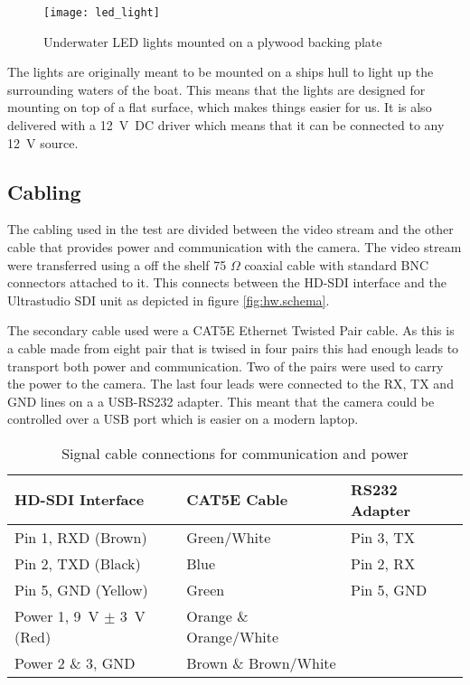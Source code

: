\begin{figure}[htbp]
	\centering
	\texttt{[image: led\_light]}
	\caption{Underwater LED lights mounted on a plywood backing plate}
	\label{fig:underwater_light}
\end{figure}

The lights are originally meant to be mounted on a ships hull to light up the surrounding waters of the boat. 
This means that the lights are designed for mounting on top of a flat surface, which makes things easier for us. It 
is also delivered with a \SI{12}{\volt DC} driver which means that it can be connected to any 
\SI{12}{\volt} source.

\subsection{Cabling}
The cabling used in the test are divided between the video stream and the other cable that provides power and communication with the camera.
The video stream were transferred using a off the shelf 75 $\Omega$ coaxial cable with standard BNC connectors attached to it. This 
connects between the HD-SDI interface and the Ultrastudio SDI unit as depicted in figure \vref{fig:hw.schema}.

The secondary cable used were a CAT5E Ethernet Twisted Pair cable. As this is a cable made from eight pair that is twised in four pairs this 
had enough leads to transport both power and communication. Two of the pairs were used to carry the power to the camera. The last four leads 
were connected to the RX, TX and GND lines on a a USB-RS232 adapter. This meant that the camera could be controlled over a USB port which 
is easier on a modern laptop.

\begin{table}[htbp]
	\centering
	\begin{tabular}{lll}
		\toprule
			HD-SDI Interface 									& CAT5E Cable				& RS232 Adapter \\
		\midrule
			Pin 1, RXD (Brown)									& Green/White				& Pin 3, TX		\\
			Pin 2, TXD (Black)									& Blue						& Pin 2, RX		\\
			Pin 5, GND (Yellow)									& Green						& Pin 5, GND	\\
		\midrule
			Power 1, \SI{9}{\volt} $\pm$ \SI{3}{\volt} (Red)	& Orange \& Orange/White	&				\\
			Power 2 \& 3, GND									& Brown \& Brown/White		&				\\
		\bottomrule
	\end{tabular}
	\caption{Signal cable connections for communication and power}
	\label{tbl:cabeling.connections}
\end{table}



